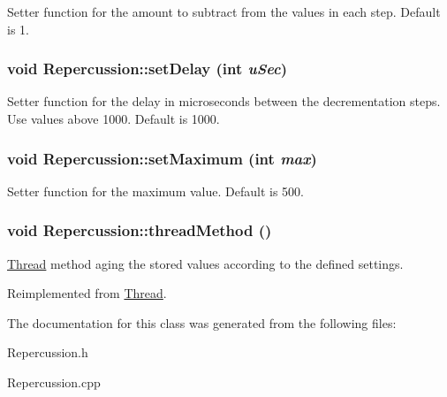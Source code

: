 \label{classRepercussion_a66219691fbf748e8751cf1c447347683}
Setter function for the amount to subtract from the values in each step. Default is 1. \hypertarget{classRepercussion_a046c98f4950c6f484cb5d07c5f295e23}{
\subsubsection[{setDelay}]{\setlength{\rightskip}{0pt plus 5cm}void Repercussion::setDelay (int {\em uSec})}}
\label{classRepercussion_a046c98f4950c6f484cb5d07c5f295e23}
Setter function for the delay in microseconds between the decrementation steps. Use values above 1000. Default is 1000. \hypertarget{classRepercussion_a8f4c193ca2406c92ebff923218c2e328}{
\subsubsection[{setMaximum}]{\setlength{\rightskip}{0pt plus 5cm}void Repercussion::setMaximum (int {\em max})}}
\label{classRepercussion_a8f4c193ca2406c92ebff923218c2e328}
Setter function for the maximum value. Default is 500. \hypertarget{classRepercussion_a903a946946c3393ea3a063d594e0fb91}{
\subsubsection[{threadMethod}]{\setlength{\rightskip}{0pt plus 5cm}void Repercussion::threadMethod ()}}
\label{classRepercussion_a903a946946c3393ea3a063d594e0fb91}
\hyperlink{classThread}{Thread} method aging the stored values according to the defined settings. 

Reimplemented from \hyperlink{classThread_adc91220b96d25109b5f3ea73f8a75947}{Thread}.

The documentation for this class was generated from the following files:\begin{DoxyCompactItemize}
\item 
Repercussion.h\item 
Repercussion.cpp\end{DoxyCompactItemize}
